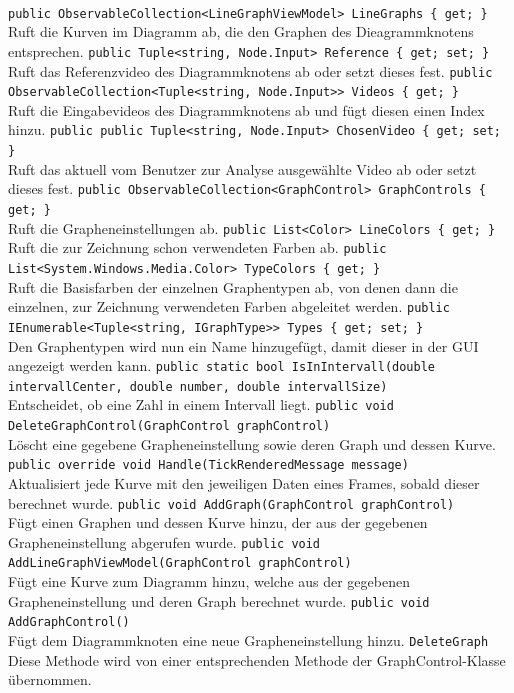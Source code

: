 \paragraph{}
\begin{itemize}
	\add \verb!public ObservableCollection<LineGraphViewModel> LineGraphs { get; }! \\
	Ruft die Kurven im Diagramm ab, die den Graphen des Dieagrammknotens entsprechen. 
	\add \verb!public Tuple<string, Node.Input> Reference { get; set; }! \\
	Ruft das Referenzvideo des Diagrammknotens ab oder setzt dieses fest.
	\add \verb!public ObservableCollection<Tuple<string, Node.Input>> Videos { get; }! \\
	Ruft die Eingabevideos des Diagrammknotens ab und fügt diesen einen Index hinzu.
	\add \verb!public public Tuple<string, Node.Input> ChosenVideo { get; set; }! \\
	Ruft das aktuell vom Benutzer zur Analyse ausgewählte Video ab oder setzt dieses fest.
	\add \verb!public ObservableCollection<GraphControl> GraphControls { get; }! \\
	Ruft die Grapheneinstellungen ab.
	\add \verb!public List<Color> LineColors { get; }! \\
	Ruft die zur Zeichnung schon verwendeten Farben ab.
	\add \verb!public List<System.Windows.Media.Color> TypeColors { get; }! \\
	Ruft die Basisfarben der einzelnen Graphentypen ab, von denen dann die einzelnen, zur Zeichnung verwendeten Farben abgeleitet werden.
	\change \verb!public IEnumerable<Tuple<string, IGraphType>> Types { get; set; }! \\
	Den Graphentypen wird nun ein Name hinzugefügt, damit dieser in der GUI angezeigt werden kann.
	\add \verb!public static bool IsInIntervall(double intervallCenter, double number, double intervallSize)! \\
	Entscheidet, ob eine Zahl in einem Intervall liegt.
	\add \verb!public void DeleteGraphControl(GraphControl graphControl)! \\
	Löscht eine gegebene Grapheneinstellung sowie deren Graph und dessen Kurve.
	\add \verb!public override void Handle(TickRenderedMessage message)! \\
	Aktualisiert jede Kurve mit den jeweiligen Daten eines Frames, sobald dieser berechnet wurde.
	\change \verb!public void AddGraph(GraphControl graphControl)! \\
	Fügt einen Graphen und dessen Kurve hinzu, der aus der gegebenen Grapheneinstellung abgerufen wurde.
	\add \verb!public void AddLineGraphViewModel(GraphControl graphControl)! \\
	Fügt eine Kurve zum Diagramm hinzu, welche aus der gegebenen Grapheneinstellung und deren Graph berechnet wurde.
	\add \verb!public void AddGraphControl()! \\
	Fügt dem Diagrammknoten eine neue Grapheneinstellung hinzu.
	\remove \verb!DeleteGraph! \\
	Diese Methode wird von einer entsprechenden Methode der GraphControl-Klasse übernommen.
\end{itemize}

